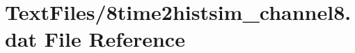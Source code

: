 \hypertarget{8time2histsim__channel8_8dat}{}\section{Text\+Files/8time2histsim\+\_\+channel8.dat File Reference}
\label{8time2histsim__channel8_8dat}
